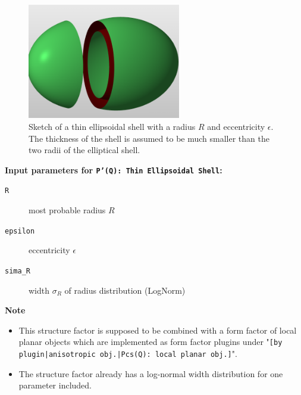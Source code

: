 \begin{figure}[htb]
\begin{center}
\includegraphics[width=0.596\textwidth,height=0.449\textwidth]{../images/form_factor/anisotropic/Ellipsoid_hollow.png}
\end{center}
\caption{Sketch of a thin ellipsoidal shell with a radius $R$ and eccentricity $\epsilon$. The thickness of the shell is assumed to be much smaller than the two radii of the elliptical shell.}
\label{fig:ThinEllipsoidalShell}
\end{figure}

\noindent
\textbf{Input parameters for \texttt{P'(Q): Thin Ellipsoidal Shell}:}
\begin{description}
    \item[\texttt{R}] most probable radius $R$
    \item[\texttt{epsilon}] eccentricity $\epsilon$
    \item[\texttt{sima\_R}] width $\sigma_R$ of radius distribution (LogNorm)
\end{description}

\noindent
\textbf{Note}
\begin{itemize}
  \item This structure factor is supposed to be combined with a form factor of local planar objects which are implemented as form factor plugins
under "\texttt{[by plugin|anisotropic obj.|Pcs(Q): local planar obj.]}".
\item The structure factor already has a log-normal width distribution for one parameter included.
\end{itemize}

